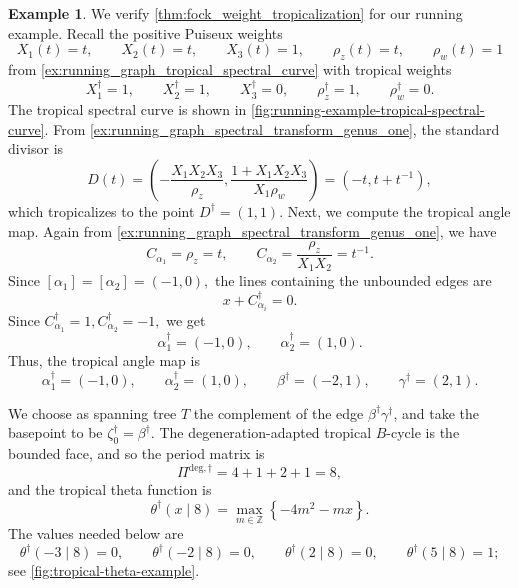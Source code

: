 \documentclass[12pt]{amsart}
\numberwithin{equation}{section}
\theoremstyle{definition}
\newtheorem{example}[theorem]{Example}
\newcommand{\Z}{\mathbb{Z}}
\def\divisor{D}
\def\trop{\dagger}
\def\divisor{D}
\def\ptSig{\zeta}
\def\baseptT{{\ptSig_0^\trop}}
\begin{document}
\begin{example}
We verify \cref{thm:fock_weight_tropicalization} for our running example. Recall the positive Puiseux weights
\[
X_1(t)=t, \qquad X_2(t)=t,\qquad
X_3(t)=1, \qquad \rho_z(t)=t,
\qquad\rho_w(t)=1
\] 
from \cref{ex:running_graph_tropical_spectral_curve} with tropical weights 
\[
X_1^\trop=1, \qquad X_2^\trop=1,
\qquad
X_3^\trop=0,
\qquad
\rho_z^\trop=1,
\qquad
\rho_w^\trop=0.
\]
The tropical spectral curve is shown in \cref{fig:running-example-tropical-spectral-curve}. From \cref{ex:running_graph_spectral_transform_genus_one}, the standard divisor is
\[
\divisor(t)
=
\left(
-\frac{X_1X_2X_3}{\rho_z},
\frac{1+X_1X_2X_3}{X_1\rho_w}
\right)
=
(-t,t+t^{-1}),
\]
which tropicalizes to the point $D^\trop=(1,1)$. Next, we compute the tropical angle map. Again from
\cref{ex:running_graph_spectral_transform_genus_one}, we have
\[
C_{\alpha_1}=\rho_z=t,
\qquad
C_{\alpha_2}
=
\frac{\rho_z}{X_1X_2}
=
t^{-1}.
\]
Since
$
[\alpha_1]=[\alpha_2]=(-1,0),
$
the lines containing the unbounded edges are
\[
x+C_{\alpha_i}^\trop=0.
\]
Since 
$
C_{\alpha_1}^\trop=1,
C_{\alpha_2}^\trop=-1,
$
we get
\[
\alpha_1^\trop=(-1,0),
\qquad
\alpha_2^\trop=(1,0).
\]
Thus, the tropical angle map is
\[
\alpha_1^\trop=(-1,0),
\qquad
\alpha_2^\trop=(1,0),
\qquad
\beta^\trop=(-2,1),
\qquad
\gamma^\trop=(2,1).
\]

We choose as spanning tree $T$ the complement of the edge $\beta^\trop \gamma^\trop$, and take the basepoint to be
$
\baseptT=\beta^\trop.
$
The degeneration-adapted tropical $B$-cycle is the bounded face, and so the period matrix is
\[
\Pi^{\mathrm{deg},\trop}
=
4+1+2+1
=
8,
\]
and the tropical theta function is
\[
\theta^\trop(x\mid 8)
=
\max_{m\in\Z}
\left\{
-4m^2-mx
\right\}.
\]
The values needed below are
\[
\theta^\trop(-3\mid8)=0,
\qquad
\theta^\trop(-2\mid8)=0,
\qquad
\theta^\trop(2\mid8)=0,
\qquad
\theta^\trop(5\mid8)=1;
\]
see \cref{fig:tropical-theta-example}.

\begin{figure}
\centering

\end{figure}
\end{example}
\end{document}
